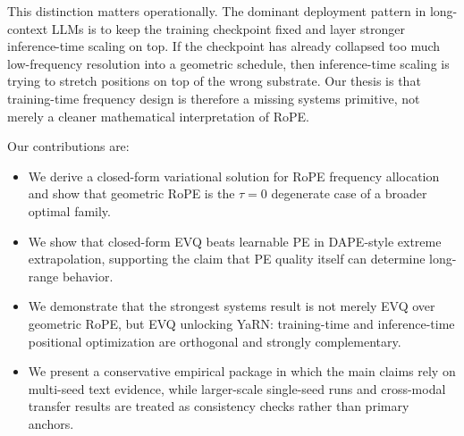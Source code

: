 This distinction matters operationally. The dominant deployment pattern in long-context LLMs is to keep the training checkpoint fixed and layer stronger inference-time scaling on top. If the checkpoint has already collapsed too much low-frequency resolution into a geometric schedule, then inference-time scaling is trying to stretch positions on top of the wrong substrate. Our thesis is that training-time frequency design is therefore a missing systems primitive, not merely a cleaner mathematical interpretation of RoPE.

Our contributions are:
\begin{itemize}
\item We derive a closed-form variational solution for RoPE frequency allocation and show that geometric RoPE is the \(\tau=0\) degenerate case of a broader optimal family.
\item We show that closed-form EVQ beats learnable PE in DAPE-style extreme extrapolation, supporting the claim that PE quality itself can determine long-range behavior.
\item We demonstrate that the strongest systems result is not merely EVQ over geometric RoPE, but EVQ unlocking YaRN: training-time and inference-time positional optimization are orthogonal and strongly complementary.
\item We present a conservative empirical package in which the main claims rely on multi-seed text evidence, while larger-scale single-seed runs and cross-modal transfer results are treated as consistency checks rather than primary anchors.
\end{itemize}
